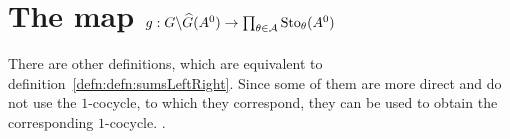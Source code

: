 \begin{comment}
  \begin{cor}
    \marginnote{\cite[Cor.III.2.7]{Loday1994}}
    Write the twisted cocyle $\dot\phi\in\exp_{A^1}(\hat F^k)$ in terms of
    sums of $\hat F^k$ over $\cU^{\leq k}$:
    \[
      \dot \phi_\theta=S_\theta^-(\hat F^k)^{-1}S_\theta^+(\hat F^k)
      \text{, }
      \theta\in\A^{\leq k} \,.
    \]
    Then, the factors $\dot g^k=(\dot g^k_\theta)_{\theta\in\A^{\leq k}}$ and
    $\dot f^k=(\dot f^k_\theta)_{\theta\in\A^{\leq k}}$ in the induced
    decompositions satisfy
    \begin{align*}
      \dot g_\theta^k &=S_\theta^+(\hat F^{<k})^{-1}
                        S_\theta^-(\hat F^k)^{-1}
                        S_\theta^+(\hat F^k)
                        S_\theta^+(\hat F^{<k}) \,,
    \\\dot f_\theta^k &=S_\theta^-(\hat F^{<k})^{-1}
                        S_\theta^-(\hat F^k)^{-1}
                        S_\theta^+(\hat F^k)
                        S_\theta^+(\hat F^{<k}) \,.
    \end{align*}
  \end{cor}
\end{comment}

\section{The map
  $g:G\backslash\widehat G(A^0)\to\prod_{\theta\in\mathcal{A}}\operatorname{Sto}_\theta(A^0)$}
  \label{sect:multisummmap}
There are other definitions, which are equivalent to
definition~\ref{defn:defn:sumsLeftRight}. Since some of them are more direct
and do not use the $1$-cocycle, to which they correspond, they can be used to
obtain the corresponding $1$-cocycle.  \cite{Loday2014}.

